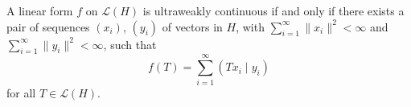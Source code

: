\begin{proposition}
A linear form $f$ on $\mathcal{L}(H)$ is ultraweakly continuous if and only if there exists a pair of sequences $(x_i)$, $(y_i)$ of vectors in $H$, with $\sum_{i=1}^{\infty} \|x_i\|^2 < \infty$ and $\sum_{i=1}^{\infty} \|y_i\|^2 < \infty$, such that
$$f(T) = \sum_{i=1}^{\infty} (Tx_i \mid y_i)$$
for all $T \in \mathcal{L}(H)$.
\end{proposition}
